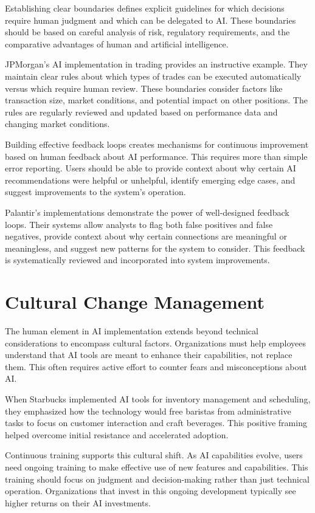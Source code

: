 \documentclass[
  Letterpaper,
]{scrbook}
\begin{document}
Establishing clear boundaries defines explicit guidelines for which
decisions require human judgment and which can be delegated to AI. These
boundaries should be based on careful analysis of risk, regulatory
requirements, and the comparative advantages of human and artificial
intelligence.

JPMorgan's AI implementation in trading provides an instructive example.
They maintain clear rules about which types of trades can be executed
automatically versus which require human review. These boundaries
consider factors like transaction size, market conditions, and potential
impact on other positions. The rules are regularly reviewed and updated
based on performance data and changing market conditions.

Building effective feedback loops creates mechanisms for continuous
improvement based on human feedback about AI performance. This requires
more than simple error reporting. Users should be able to provide
context about why certain AI recommendations were helpful or unhelpful,
identify emerging edge cases, and suggest improvements to the system's
operation.

Palantir's implementations demonstrate the power of well-designed
feedback loops. Their systems allow analysts to flag both false
positives and false negatives, provide context about why certain
connections are meaningful or meaningless, and suggest new patterns for
the system to consider. This feedback is systematically reviewed and
incorporated into system improvements.

\section{Cultural Change Management}\label{cultural-change-management}

The human element in AI implementation extends beyond technical
considerations to encompass cultural factors. Organizations must help
employees understand that AI tools are meant to enhance their
capabilities, not replace them. This often requires active effort to
counter fears and misconceptions about AI.

When Starbucks implemented AI tools for inventory management and
scheduling, they emphasized how the technology would free baristas from
administrative tasks to focus on customer interaction and craft
beverages. This positive framing helped overcome initial resistance and
accelerated adoption.

Continuous training supports this cultural shift. As AI capabilities
evolve, users need ongoing training to make effective use of new
features and capabilities. This training should focus on judgment and
decision-making rather than just technical operation. Organizations that
invest in this ongoing development typically see higher returns on their
AI investments.
\end{document}
